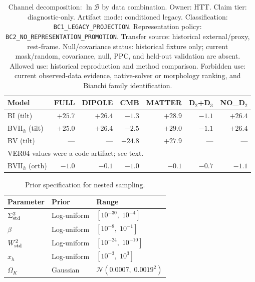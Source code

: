 \begin{table}[t]
\centering
\caption{Channel decomposition: $\ln\mathcal{B}$ by data combination.
Owner: HTT.  Claim tier: diagnostic-only.  Artifact mode: conditioned
legacy.  Classification: \texttt{BC1\_LEGACY\_PROJECTION}.
Representation policy:
\texttt{BC2\_NO\_REPRESENTATION\_PROMOTION}.  Transfer source:
historical external/proxy, rest-frame.
Null/covariance status: historical fixture only; current mask/random,
covariance, null, PPC, and held-out validation are absent.  Allowed use:
historical reproduction and method comparison.  Forbidden use: current
observed-data evidence, native-solver or morphology ranking, and Bianchi
family identification.}
\label{tab:decomposition-results}
\footnotesize
\begin{tabular}{lrrrrrr}
\toprule
Model & FULL & DIPOLE & CMB & MATTER & D$_2$+D$_3$ & NO\_D$_2$ \\
\midrule
BI (tilt) & $+25.7$ & $+26.4$ & $-1.3$ & $+28.9$ & $-1.1$ & $+26.4$ \\
BVII$_h$ (tilt) & $+25.0$ & $+26.4$ & $-2.5$ & $+29.0$ & $-1.1$ & $+26.4$ \\
BV (tilt) & --- & --- & $+24.8$ & $+27.9$ & --- & --- \\ \multicolumn{7}{l}{\footnotesize VER04 values were a code artifact; see text.}\\
BVII$_h$ (orth) & $-1.0$ & $-0.1$ & $-1.0$ & $-0.1$ & $-0.7$ & $-1.1$ \\
\bottomrule
\end{tabular}
\end{table}

\begin{table}[t]
\centering
\caption{Prior specification for nested sampling.}
\label{tab:priors}
\footnotesize
\begin{tabular}{lll}
\toprule
Parameter & Prior & Range \\
\midrule
$\Sigma^2_{\mathrm{std}}$ & Log-uniform & $[10^{-30},\;10^{-4}]$ \\
$\beta$ & Log-uniform & $[10^{-8},\;10^{-1}]$ \\
$W^2_{\mathrm{std}}$ & Log-uniform & $[10^{-24},\;10^{-10}]$ \\
$x_h$ & Log-uniform & $[10^{-3},\;10^{3}]$ \\
$\Omega_K$ & Gaussian & $\mathcal{N}(0.0007,\; 0.0019^2)$ \\
\bottomrule
\end{tabular}
\end{table}


